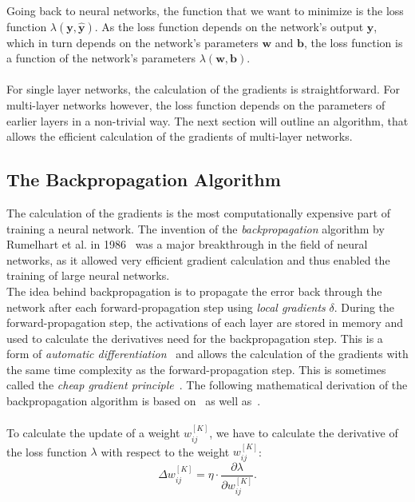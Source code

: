 Going back to neural networks, the function that we want to minimize is the loss function $\lambda(\bm{y}, \bm{\hat{y}})$. 
As the loss function depends on the network's output $\bm{y}$, which in turn depends on the network's parameters $\bm{w}$ and $\bm{b}$, the loss function is a function of the network's parameters $\lambda(\bm{w}, \bm{b})$. 
\\
\\
For single layer networks, the calculation of the gradients is straightforward. 
For multi-layer networks however, the loss function depends on the parameters of earlier layers in a non-trivial way. 
The next section will outline an algorithm, that allows the efficient calculation of the gradients of multi-layer networks.

\subsection{The Backpropagation Algorithm}
\label{subsec:backprop}
The calculation of the gradients is the most computationally expensive part of training a neural network. The invention of the \textit{backpropagation} algorithm by Rumelhart et al. in 1986~\cite{rumelhart_learning_1986} was a major breakthrough in the field of neural networks, as it allowed very efficient gradient calculation and thus enabled the training of large neural networks. 
\\
The idea behind backpropagation is to propagate the error back through the network after each forward-propagation step using \textit{local gradients} $\delta$.
During the forward-propagation step, the activations of each layer are stored in memory and used to calculate the derivatives need for the backpropagation step.
This is a form of \textit{automatic differentiation}~\cite{adams_backprop_autodiff_nodate,rall_autodiff_1981} and allows the calculation of the gradients with the same time complexity as the forward-propagation step.
This is sometimes called the \textit{cheap gradient principle}~\cite{griewank_derivatives_2008}. The following mathematical derivation of the backpropagation algorithm is based on~\cite[chapter 4.4]{haykin_neural_1998} as well as~\cite[chapter 6.5]{goodfellow_deep_2016}.
\\
\\
To calculate the update of a weight $w_{ij}^{[K]}$, we have to calculate the derivative of the loss function $\lambda$ with respect to the weight $w_{ij}^{[K]}$:
\begin{equation}
    \Delta w_{ij}^{[K]} = \eta \cdot \frac{\partial \lambda}{\partial w_{ij}^{[K]}} \text{.}
    \label{eq:weight-derivative} 
\end{equation}
